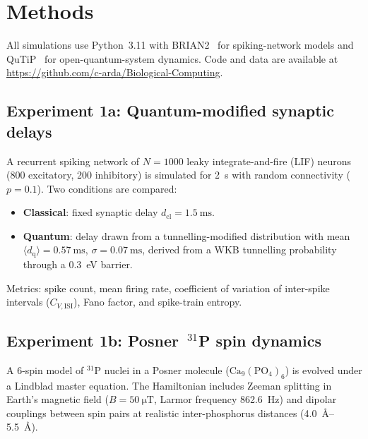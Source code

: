 \documentclass[twocolumn,11pt]{article}
\newcommand{\CVISI}{C_{\!V,\mathrm{ISI}}}
\begin{document}
\section{Methods}
\label{sec:methods}

All simulations use Python~3.11 with BRIAN2~\cite{Stimberg2019}
for spiking-network models and
QuTiP~\cite{Johansson2012,Johansson2013} for open-quantum-system
dynamics.  Code and data are available at
\url{https://github.com/c-arda/Biological-Computing}.

\subsection{Experiment 1a: Quantum-modified synaptic delays}
\label{sec:meth-1a}

A recurrent spiking network of $N = 1000$ leaky integrate-and-fire
(LIF) neurons (800 excitatory, 200 inhibitory) is simulated
for \SI{2}{\second} with random connectivity ($p = 0.1$).
Two conditions are compared:

\begin{itemize}
  \item \textbf{Classical}: fixed synaptic delay
    $d_{\mathrm{cl}} = \SI{1.5}{\milli\second}$.
  \item \textbf{Quantum}: delay drawn from a
    tunnelling-modified distribution with mean
    $\langle d_{\mathrm{q}} \rangle = \SI{0.57}{\milli\second}$,
    $\sigma = \SI{0.07}{\milli\second}$, derived from a
    WKB tunnelling probability through a
    \SI{0.3}{\electronvolt} barrier.
\end{itemize}

Metrics: spike count, mean firing rate, coefficient of variation
of inter-spike intervals ($\CVISI$), Fano factor, and
spike-train entropy.

\subsection{Experiment 1b: Posner~$^{31}$P spin dynamics}
\label{sec:meth-1b}

A 6-spin model of $^{31}$P nuclei in a Posner molecule
($\mathrm{Ca_9(PO_4)_6}$) is evolved under a Lindblad master
equation.  The Hamiltonian includes Zeeman splitting in Earth's
magnetic field ($B = \SI{50}{\micro\tesla}$, Larmor frequency
\SI{862.6}{\hertz}) and dipolar couplings between spin pairs at
realistic inter-phosphorus distances
(\SIrange{4.0}{5.5}{\angstrom}).
\end{document}
